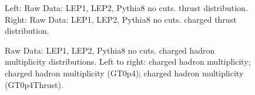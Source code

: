 \begin{figure}[H]
\centering
{}\hfill
{}\hfill %
\caption{Left: Raw Data: LEP1, LEP2, Pythia8 no cuts. thrust distribution. Right: Raw Data: LEP1, LEP2, Pythia8 no cuts. charged thrust distribution.}
\end{figure}

\begin{figure}[H]
\centering
{}\hfill
{}\hfill
{}\hfill
\caption{Raw Data: LEP1, LEP2, Pythia8 no cuts. charged hadron multiplicity distributions. Left to right: charged hadron multiplicity; charged hadron multiplicity (GT0p4); charged hadron multiplicity (GT0p4Thrust).}
\end{figure}

